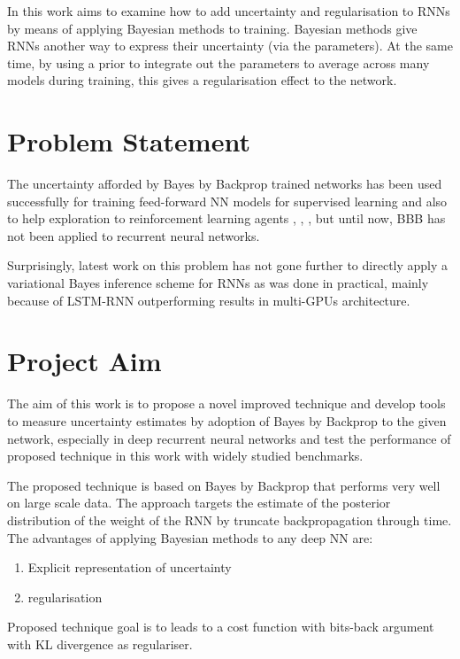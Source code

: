 In this work aims to examine how to add uncertainty and regularisation to RNNs by means of applying Bayesian methods to training.
Bayesian methods give RNNs another way to express their uncertainty (via the parameters).
At the same time, by using a prior to integrate out the parameters to average across many models during training, this gives a regularisation effect to the network.


\section{Problem Statement}

The uncertainty afforded by Bayes by Backprop trained networks has been used successfully for training feed-forward NN models for supervised learning and also to help exploration to reinforcement learning agents \cite{Blundell2015a}, \cite{Lipton2016}, \cite{Houthooft2016}, but until now, BBB has not been applied to recurrent neural networks.

Surprisingly, latest work on this problem has not gone further to directly apply a variational Bayes inference scheme for RNNs as was done in practical, mainly because of LSTM-RNN outperforming results in multi-GPUs architecture.

\section{Project Aim}

The aim of this work is to propose a novel improved technique and develop tools to measure uncertainty estimates by adoption of Bayes by Backprop to the given network, especially in deep recurrent neural networks and test the performance of proposed technique in this work with widely studied benchmarks.

The proposed technique is based on Bayes by Backprop \cite{Blundell2015a} that performs very well on large scale data.
The approach targets the estimate of the posterior distribution of the weight of the RNN by truncate backpropagation through time.
The advantages of applying Bayesian methods to any deep NN are:
\begin{enumerate}
	\item Explicit representation of uncertainty
	\item regularisation
\end{enumerate}
Proposed technique goal is to leads to a cost function with bits-back argument \cite{Hinton1993} with KL divergence as regulariser.

